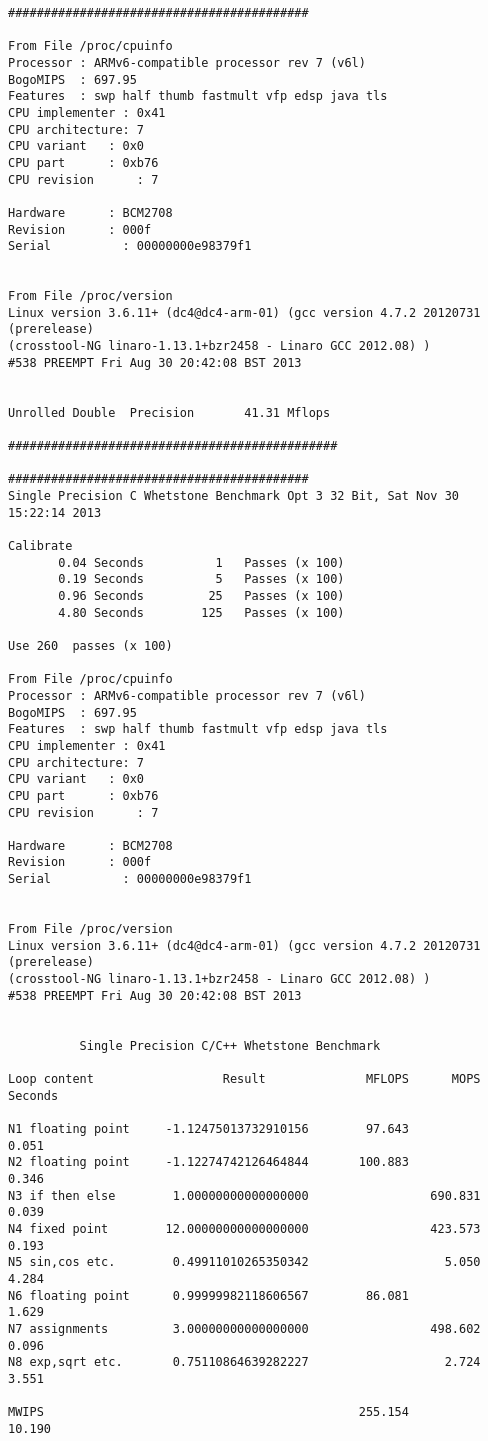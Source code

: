 \begin{verbatim}
##########################################

From File /proc/cpuinfo
Processor : ARMv6-compatible processor rev 7 (v6l)
BogoMIPS  : 697.95
Features  : swp half thumb fastmult vfp edsp java tls 
CPU implementer	: 0x41
CPU architecture: 7
CPU variant	  : 0x0
CPU part	  : 0xb76
CPU revision	  : 7

Hardware	  : BCM2708
Revision	  : 000f
Serial		    : 00000000e98379f1


From File /proc/version
Linux version 3.6.11+ (dc4@dc4-arm-01) (gcc version 4.7.2 20120731 (prerelease) 
(crosstool-NG linaro-1.13.1+bzr2458 - Linaro GCC 2012.08) ) 
#538 PREEMPT Fri Aug 30 20:42:08 BST 2013


Unrolled Double  Precision       41.31 Mflops 

##############################################

##########################################
Single Precision C Whetstone Benchmark Opt 3 32 Bit, Sat Nov 30 15:22:14 2013

Calibrate
       0.04 Seconds          1   Passes (x 100)
       0.19 Seconds          5   Passes (x 100)
       0.96 Seconds         25   Passes (x 100)
       4.80 Seconds        125   Passes (x 100)

Use 260  passes (x 100)

From File /proc/cpuinfo
Processor : ARMv6-compatible processor rev 7 (v6l)
BogoMIPS  : 697.95
Features  : swp half thumb fastmult vfp edsp java tls 
CPU implementer	: 0x41
CPU architecture: 7
CPU variant	  : 0x0
CPU part	  : 0xb76
CPU revision	  : 7

Hardware	  : BCM2708
Revision	  : 000f
Serial		    : 00000000e98379f1


From File /proc/version
Linux version 3.6.11+ (dc4@dc4-arm-01) (gcc version 4.7.2 20120731 (prerelease) 
(crosstool-NG linaro-1.13.1+bzr2458 - Linaro GCC 2012.08) ) 
#538 PREEMPT Fri Aug 30 20:42:08 BST 2013


          Single Precision C/C++ Whetstone Benchmark

Loop content                  Result              MFLOPS      MOPS   Seconds

N1 floating point     -1.12475013732910156        97.643              0.051
N2 floating point     -1.12274742126464844       100.883              0.346
N3 if then else        1.00000000000000000                 690.831    0.039
N4 fixed point        12.00000000000000000                 423.573    0.193
N5 sin,cos etc.        0.49911010265350342                   5.050    4.284
N6 floating point      0.99999982118606567        86.081              1.629
N7 assignments         3.00000000000000000                 498.602    0.096
N8 exp,sqrt etc.       0.75110864639282227                   2.724    3.551

MWIPS                                            255.154             10.190

\end{verbatim}

